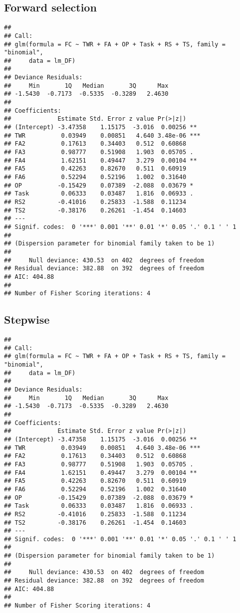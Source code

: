 \documentclass[]{article}
\begin{document}
\hypertarget{forward-selection-2}{%
\subsection{Forward selection}\label{forward-selection-2}}

\begin{verbatim}
## 
## Call:
## glm(formula = FC ~ TWR + FA + OP + Task + RS + TS, family = "binomial", 
##     data = lm_DF)
## 
## Deviance Residuals: 
##     Min       1Q   Median       3Q      Max  
## -1.5430  -0.7173  -0.5335  -0.3289   2.4630  
## 
## Coefficients:
##             Estimate Std. Error z value Pr(>|z|)    
## (Intercept) -3.47358    1.15175  -3.016  0.00256 ** 
## TWR          0.03949    0.00851   4.640 3.48e-06 ***
## FA2          0.17613    0.34403   0.512  0.60868    
## FA3          0.98777    0.51908   1.903  0.05705 .  
## FA4          1.62151    0.49447   3.279  0.00104 ** 
## FA5          0.42263    0.82670   0.511  0.60919    
## FA6          0.52294    0.52196   1.002  0.31640    
## OP          -0.15429    0.07389  -2.088  0.03679 *  
## Task         0.06333    0.03487   1.816  0.06933 .  
## RS2         -0.41016    0.25833  -1.588  0.11234    
## TS2         -0.38176    0.26261  -1.454  0.14603    
## ---
## Signif. codes:  0 '***' 0.001 '**' 0.01 '*' 0.05 '.' 0.1 ' ' 1
## 
## (Dispersion parameter for binomial family taken to be 1)
## 
##     Null deviance: 430.53  on 402  degrees of freedom
## Residual deviance: 382.88  on 392  degrees of freedom
## AIC: 404.88
## 
## Number of Fisher Scoring iterations: 4
\end{verbatim}

\hypertarget{stepwise-2}{%
\subsection{Stepwise}\label{stepwise-2}}

\begin{verbatim}
## 
## Call:
## glm(formula = FC ~ TWR + FA + OP + Task + RS + TS, family = "binomial", 
##     data = lm_DF)
## 
## Deviance Residuals: 
##     Min       1Q   Median       3Q      Max  
## -1.5430  -0.7173  -0.5335  -0.3289   2.4630  
## 
## Coefficients:
##             Estimate Std. Error z value Pr(>|z|)    
## (Intercept) -3.47358    1.15175  -3.016  0.00256 ** 
## TWR          0.03949    0.00851   4.640 3.48e-06 ***
## FA2          0.17613    0.34403   0.512  0.60868    
## FA3          0.98777    0.51908   1.903  0.05705 .  
## FA4          1.62151    0.49447   3.279  0.00104 ** 
## FA5          0.42263    0.82670   0.511  0.60919    
## FA6          0.52294    0.52196   1.002  0.31640    
## OP          -0.15429    0.07389  -2.088  0.03679 *  
## Task         0.06333    0.03487   1.816  0.06933 .  
## RS2         -0.41016    0.25833  -1.588  0.11234    
## TS2         -0.38176    0.26261  -1.454  0.14603    
## ---
## Signif. codes:  0 '***' 0.001 '**' 0.01 '*' 0.05 '.' 0.1 ' ' 1
## 
## (Dispersion parameter for binomial family taken to be 1)
## 
##     Null deviance: 430.53  on 402  degrees of freedom
## Residual deviance: 382.88  on 392  degrees of freedom
## AIC: 404.88
## 
## Number of Fisher Scoring iterations: 4
\end{verbatim}
\end{document}
